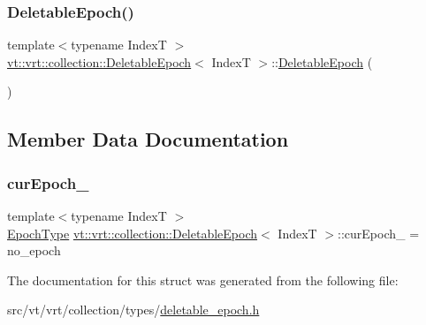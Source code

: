 \subsubsection{\texorpdfstring{Deletable\+Epoch()}{DeletableEpoch()}}
{\footnotesize\ttfamily template$<$typename IndexT $>$ \\
\hyperlink{structvt_1_1vrt_1_1collection_1_1_deletable_epoch}{vt\+::vrt\+::collection\+::\+Deletable\+Epoch}$<$ IndexT $>$\+::\hyperlink{structvt_1_1vrt_1_1collection_1_1_deletable_epoch}{Deletable\+Epoch} (\begin{DoxyParamCaption}{ }\end{DoxyParamCaption})\hspace{0.3cm}{\ttfamily [inline]}}



\subsection{Member Data Documentation}
\mbox{\label{structvt_1_1vrt_1_1collection_1_1_deletable_epoch_acba17c908f0511a830712bb44894ceac}} 
\subsubsection{\texorpdfstring{cur\+Epoch\+\_\+}{curEpoch\_}}
{\footnotesize\ttfamily template$<$typename IndexT $>$ \\
\hyperlink{namespacevt_a985a5adf291c34a3ca263b3378388236}{Epoch\+Type} \hyperlink{structvt_1_1vrt_1_1collection_1_1_deletable_epoch}{vt\+::vrt\+::collection\+::\+Deletable\+Epoch}$<$ IndexT $>$\+::cur\+Epoch\+\_\+ = no\+\_\+epoch\hspace{0.3cm}{\ttfamily [protected]}}



The documentation for this struct was generated from the following file\+:\begin{DoxyCompactItemize}
\item 
src/vt/vrt/collection/types/\hyperlink{deletable__epoch_8h}{deletable\+\_\+epoch.\+h}\end{DoxyCompactItemize}
